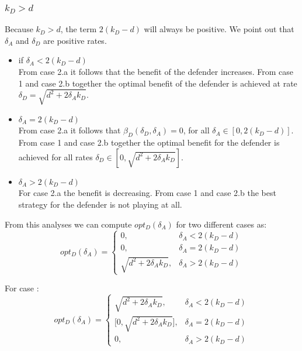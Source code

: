 \subsubsection{$k_{D} > d$}
Because $k_{D} > d$, the term $2(k_{D} - d)$ will always be positive. We point out that $\delta_{A}$ and $\delta_{D}$ are positive rates.
\begin{itemize}
\item if $\delta_{A} < 2(k_{D} - d)$ \\
From case 2.a it follows that the benefit of the defender increases. From case 1 and case 2.b together the optimal benefit of the defender is achieved at rate $\delta_{D} = \sqrt{d^{2} + 2\delta_{A}k_{D}}$.
\item $\delta_{A} = 2(k_{D} - d)$ \\
From case 2.a it follows that $\beta_{D}(\delta_{D},\delta_{A})=0$, for all $\delta_{A} \in [0,2(k_{D} - d)]$. From case 1 and case 2.b together the optimal benefit for the defender is achieved for all rates $\delta_{D} \in [0, \sqrt{d^{2} + 2\delta_{A}k_{D}}]$.
\item $\delta_{A} > 2(k_{D} - d)$ \\
For case 2.a the benefit is decreasing. From case 1 and case 2.b the best strategy for the defender is not playing at all. 
\end{itemize}

From this analyses we can compute $opt_{D}(\delta_{A})$ for two different cases as:
 \begin{displaymath}
  opt_{D}(\delta_{A}) = \left\{
     \begin{array}{lr}
       0, & \delta_{A} < 2(k_{D} - d)\\
       0, & \delta_{A} = 2(k_{D} - d) \\
       \sqrt{d^{2} + 2\delta_{A}k_{D}}, & \delta_{A} > 2(k_{D} - d)
     \end{array}
   \right.
\end{displaymath}

For case :
 \begin{displaymath}
  opt_{D}(\delta_{A}) = \left\{
     \begin{array}{lr}
       \sqrt{d^{2} + 2\delta_{A}k_{D}}, & \delta_{A} < 2(k_{D} - d)\\
       \big[0,\sqrt{d^{2} + 2\delta_{A}k_{D}}\big], & \delta_{A} = 2(k_{D} - d) \\
       0, & \delta_{A} > 2(k_{D} - d)
     \end{array}
   \right.
\end{displaymath}


